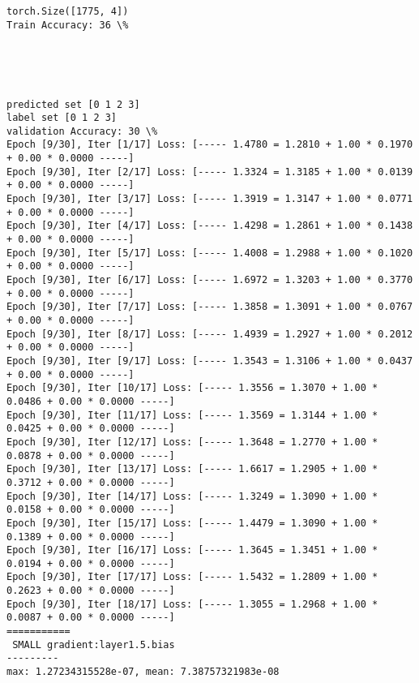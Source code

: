 \documentclass[11pt]{article}
\begin{document}
    \begin{Verbatim}[commandchars=\\\{\}]
torch.Size([1775, 4])
Train Accuracy: 36 \%

    \end{Verbatim}

    \begin{center}
    \end{center}
    { \hspace*{\fill} \\}
    
    \begin{center}
    \end{center}
    { \hspace*{\fill} \\}
    
    \begin{Verbatim}[commandchars=\\\{\}]
predicted set [0 1 2 3]
label set [0 1 2 3]
validation Accuracy: 30 \%
Epoch [9/30], Iter [1/17] Loss: [----- 1.4780 = 1.2810 + 1.00 * 0.1970 + 0.00 * 0.0000 -----]
Epoch [9/30], Iter [2/17] Loss: [----- 1.3324 = 1.3185 + 1.00 * 0.0139 + 0.00 * 0.0000 -----]
Epoch [9/30], Iter [3/17] Loss: [----- 1.3919 = 1.3147 + 1.00 * 0.0771 + 0.00 * 0.0000 -----]
Epoch [9/30], Iter [4/17] Loss: [----- 1.4298 = 1.2861 + 1.00 * 0.1438 + 0.00 * 0.0000 -----]
Epoch [9/30], Iter [5/17] Loss: [----- 1.4008 = 1.2988 + 1.00 * 0.1020 + 0.00 * 0.0000 -----]
Epoch [9/30], Iter [6/17] Loss: [----- 1.6972 = 1.3203 + 1.00 * 0.3770 + 0.00 * 0.0000 -----]
Epoch [9/30], Iter [7/17] Loss: [----- 1.3858 = 1.3091 + 1.00 * 0.0767 + 0.00 * 0.0000 -----]
Epoch [9/30], Iter [8/17] Loss: [----- 1.4939 = 1.2927 + 1.00 * 0.2012 + 0.00 * 0.0000 -----]
Epoch [9/30], Iter [9/17] Loss: [----- 1.3543 = 1.3106 + 1.00 * 0.0437 + 0.00 * 0.0000 -----]
Epoch [9/30], Iter [10/17] Loss: [----- 1.3556 = 1.3070 + 1.00 * 0.0486 + 0.00 * 0.0000 -----]
Epoch [9/30], Iter [11/17] Loss: [----- 1.3569 = 1.3144 + 1.00 * 0.0425 + 0.00 * 0.0000 -----]
Epoch [9/30], Iter [12/17] Loss: [----- 1.3648 = 1.2770 + 1.00 * 0.0878 + 0.00 * 0.0000 -----]
Epoch [9/30], Iter [13/17] Loss: [----- 1.6617 = 1.2905 + 1.00 * 0.3712 + 0.00 * 0.0000 -----]
Epoch [9/30], Iter [14/17] Loss: [----- 1.3249 = 1.3090 + 1.00 * 0.0158 + 0.00 * 0.0000 -----]
Epoch [9/30], Iter [15/17] Loss: [----- 1.4479 = 1.3090 + 1.00 * 0.1389 + 0.00 * 0.0000 -----]
Epoch [9/30], Iter [16/17] Loss: [----- 1.3645 = 1.3451 + 1.00 * 0.0194 + 0.00 * 0.0000 -----]
Epoch [9/30], Iter [17/17] Loss: [----- 1.5432 = 1.2809 + 1.00 * 0.2623 + 0.00 * 0.0000 -----]
Epoch [9/30], Iter [18/17] Loss: [----- 1.3055 = 1.2968 + 1.00 * 0.0087 + 0.00 * 0.0000 -----]
===========
 SMALL gradient:layer1.5.bias
---------
max: 1.27234315528e-07, mean: 7.38757321983e-08

    \end{Verbatim}
\end{document}
